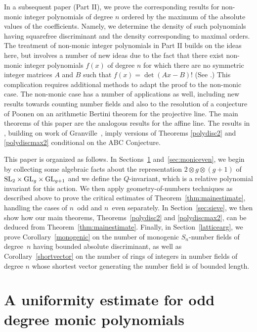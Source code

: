 \documentclass[11pt]{article}
\def\SL{{\rm SL}}
\def\GL{{\rm GL}}
\begin{document}
In a subsequent paper \cite{SqSieve2} (Part II), we prove the
corresponding results for non-monic integer polynomials of degree $n$
ordered by the maximum of the absolute values of the coefficients.
Namely, we determine the density of such polynomials 
having squarefree discriminant and the density corresponding to maximal orders. The
treatment of non-monic integer polynomials in Part II builds on the
ideas here, but involves a number of new ideas due to the fact that
there exist non-monic integer polynomials $f(x)$ of degree $n$ for
which there are no symmetric integer matrices $A$ and $B$ such that
$f(x) = \det(Ax-B)$!  (See \cite{BGWhyper}.)  This
complication requires additional methods to adapt the proof to the
non-monic case.  The non-monic case has a number of applications as
well, including new results towards counting number fields and also to
the resolution of a conjecture of Poonen \cite{PBertini} on an
arithmetic Bertini theorem for the projective line. The main
theorems of this paper are the analogous results for the affine
line. The results in \cite{PBertini}, building on work of
Granville~\cite{Gabc}, imply versions of Theorems \ref{polydisc2} and
\ref{polydiscmax2} conditional on the ABC Conjecture.

\vspace{.1in} 
This paper is organized as follows. In Sections~\ref{sec:monicodd} and~\ref{sec:moniceven}, we begin by
collecting some algebraic facts about the representation $2\otimes
g\otimes(g+1)$ of $\SL_2\times\GL_g\times\GL_{g+1}$ and we define the
$Q$-invariant, which is a relative polynomial invariant for this
action.  We
then apply geometry-of-numbers techniques as described above to prove
the critical estimates of Theorem~\ref{thm:mainestimate}, handling the cases of $n$~odd and $n$~even separately. In
Section~\ref{sec:sieve}, we then show how our main theorems, Theorems~\ref{polydisc2} and \ref{polydiscmax2}, can be deduced from
Theorem~\ref{thm:mainestimate}.  Finally, in Section~\ref{latticearg},
we prove Corollary~\ref{monogenic} on the number of monogenic
$S_n$-number fields of degree~$n$ having bounded absolute
discriminant, as well as Corollary~\ref{shortvector} on the number of
rings of integers in number fields of degree $n$ whose shortest vector
generating the number field is of bounded length.



\section{A uniformity estimate for odd degree monic polynomials}\label{sec:monicodd}
\end{document}
